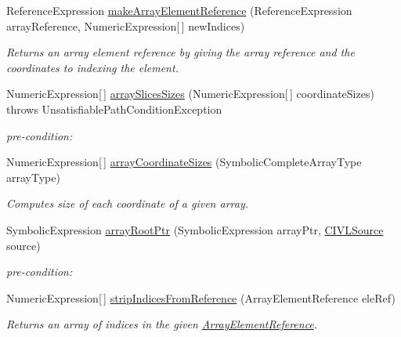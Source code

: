 \begin{DoxyCompactItemize}
Reference\+Expression \hyperlink{classedu_1_1udel_1_1cis_1_1vsl_1_1civl_1_1dynamic_1_1common_1_1CommonSymbolicUtility_a9b745ec8472d840851d867be767e0a28}{make\+Array\+Element\+Reference} (Reference\+Expression array\+Reference, Numeric\+Expression\mbox{[}$\,$\mbox{]} new\+Indices)
\begin{DoxyCompactList}\small\item\em Returns an array element reference by giving the array reference and the coordinates to indexing the element. \end{DoxyCompactList}\item 
Numeric\+Expression\mbox{[}$\,$\mbox{]} \hyperlink{classedu_1_1udel_1_1cis_1_1vsl_1_1civl_1_1dynamic_1_1common_1_1CommonSymbolicUtility_affaa1d9253f7b8844165f0a18e5526c5}{array\+Slices\+Sizes} (Numeric\+Expression\mbox{[}$\,$\mbox{]} coordinate\+Sizes)  throws Unsatisfiable\+Path\+Condition\+Exception 
\begin{DoxyCompactList}\small\item\em pre-\/condition\+: \end{DoxyCompactList}\item 
Numeric\+Expression\mbox{[}$\,$\mbox{]} \hyperlink{classedu_1_1udel_1_1cis_1_1vsl_1_1civl_1_1dynamic_1_1common_1_1CommonSymbolicUtility_a9263d7353306d6d776733f15236edd8a}{array\+Coordinate\+Sizes} (Symbolic\+Complete\+Array\+Type array\+Type)
\begin{DoxyCompactList}\small\item\em Computes size of each coordinate of a given array. \end{DoxyCompactList}\item 
Symbolic\+Expression \hyperlink{classedu_1_1udel_1_1cis_1_1vsl_1_1civl_1_1dynamic_1_1common_1_1CommonSymbolicUtility_a9851cdffd52e41217d567bf88a9ced05}{array\+Root\+Ptr} (Symbolic\+Expression array\+Ptr, \hyperlink{interfaceedu_1_1udel_1_1cis_1_1vsl_1_1civl_1_1model_1_1IF_1_1CIVLSource}{C\+I\+V\+L\+Source} source)
\begin{DoxyCompactList}\small\item\em pre-\/condition\+: \end{DoxyCompactList}\item 
Numeric\+Expression\mbox{[}$\,$\mbox{]} \hyperlink{classedu_1_1udel_1_1cis_1_1vsl_1_1civl_1_1dynamic_1_1common_1_1CommonSymbolicUtility_a180532fa7b4363479ef899acf5be5de5}{strip\+Indices\+From\+Reference} (Array\+Element\+Reference ele\+Ref)
\begin{DoxyCompactList}\small\item\em Returns an array of indices in the given \hyperlink{}{Array\+Element\+Reference}. \end{DoxyCompactList}\item 

\end{DoxyCompactItemize}
